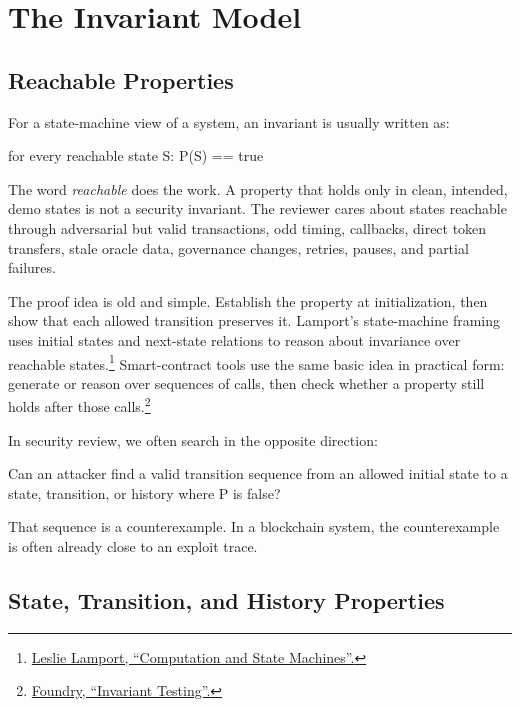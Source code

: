 \section{The Invariant Model}

\subsection{Reachable Properties}

For a state-machine view of a system, an invariant is usually written as:

\begin{codeblock}
for every reachable state S:
    P(S) == true
\end{codeblock}

The word \emph{reachable} does the work. A property that holds only in clean, intended, demo states is not a security invariant. The reviewer cares about states reachable through adversarial but valid transactions, odd timing, callbacks, direct token transfers, stale oracle data, governance changes, retries, pauses, and partial failures.

The proof idea is old and simple. Establish the property at initialization, then show that each allowed transition preserves it. Lamport's state-machine framing uses initial states and next-state relations to reason about invariance over reachable states.\footnote{\href{https://lamport.azurewebsites.net/pubs/state-machine.pdf}{Leslie Lamport, ``Computation and State Machines''.}} Smart-contract tools use the same basic idea in practical form: generate or reason over sequences of calls, then check whether a property still holds after those calls.\footnote{\href{https://www.getfoundry.sh/guides/invariant-testing}{Foundry, ``Invariant Testing''.}}

In security review, we often search in the opposite direction:

\begin{codeblock}
Can an attacker find a valid transition sequence
from an allowed initial state
to a state, transition, or history where P is false?
\end{codeblock}

That sequence is a counterexample. In a blockchain system, the counterexample is often already close to an exploit trace.

\subsection{State, Transition, and History Properties}

